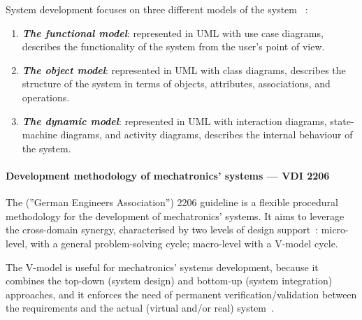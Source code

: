 System development focuses on
three different models of the system
~\cite{bruegge2004object}:
\begin{enumerate}
  \item \textbf{\emph{The functional model}}: represented in UML with use case
    diagrams, describes the functionality of the system from the user's point of
    view.
  \item \textbf{\emph{The object model}}: represented in UML with class
    diagrams, describes the structure of the system in terms of objects,
    attributes, associations, and operations.  
  \item \textbf{\emph{The dynamic model}}: represented in UML with interaction
    diagrams, state-machine diagrams, and activity diagrams, describes the
    internal behaviour of the system.
  \end{enumerate}

\paragraph{Development methodology of mechatronics' systems --- VDI 2206}
  The  (''German Engineers
Association'') 2206 guideline is a flexible procedural methodology for the
development of mechatronics' systems. It aims to leverage the cross-domain
synergy, characterised by two levels of design support~\cite{gausemeier2003new}:
micro-level, with a general problem-solving cycle; macro-level with a V-model
cycle.

The V-model is useful for mechatronics' systems development, because it combines
the top-down (system design) and bottom-up (system
integration) approaches, 
and it enforces the need of permanent verification/validation between the
requirements and the actual (virtual and/or real) system~\cite{gausemeier2003new}.

